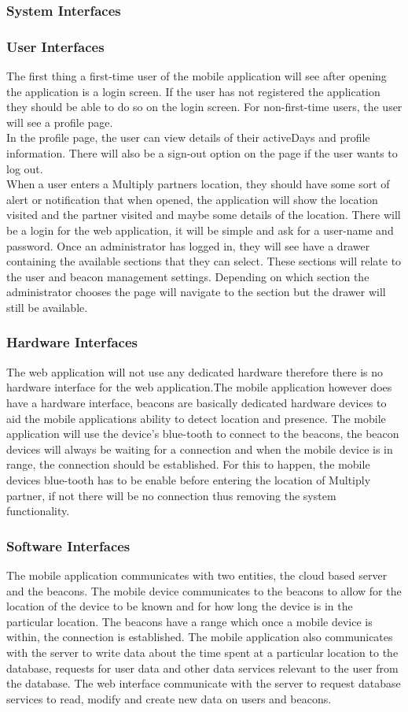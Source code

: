 \documentclass[11pt]{article}
\begin{document}
\subsubsection{System Interfaces}
\subsubsection{User Interfaces}
The first thing a first-time user of the mobile application will see after opening the application is a login screen. If the user has not registered the application they should be able to do so on the login screen. For non-first-time users, the user will see a profile page.\\
In the profile page, the user can view details of their activeDays and profile information. There will also be a sign-out option on the page if the user wants to log out.\\
When a user enters a Multiply partners location, they should have some sort of alert or notification that when opened, the application will show the location visited and the partner visited and maybe some details of the location.
There will be a login for the web application, it will be simple and ask for a user-name and password. Once an administrator has logged in, they will see have a drawer containing the available sections that they can select. These sections will relate to the user and beacon management settings. Depending on which section the administrator chooses the page will navigate to the section but the drawer will still be available.
\subsubsection{Hardware Interfaces}
The web application will not use any dedicated hardware therefore there is no hardware interface for the web application.The mobile application however does have a hardware interface, beacons are basically dedicated hardware devices to aid the mobile applications ability to detect location and presence. The mobile application will use the device's blue-tooth to connect to the beacons, the beacon devices will always be waiting for a connection and when the mobile device is in range, the connection should be established. For this to happen, the mobile devices blue-tooth has to be enable before entering the location of  Multiply partner, if not there will be no connection thus removing the system functionality.
\subsubsection{Software Interfaces}
The mobile application communicates with two entities, the cloud based server and the beacons. The mobile device communicates to the beacons to allow for the location of the device to be known and for how long the device is in the particular location. The beacons have a range which once a mobile device is within, the connection is established. The mobile application also communicates with the server to write data about the time spent at a particular location to the database, requests for user data and other data services relevant to the user from the database.
The web interface communicate with the server to request database services to read, modify and create new data on users and beacons. 
\end{document}
